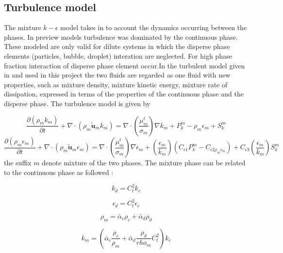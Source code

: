 \documentclass[
10pt, %
a4paper, %
oneside, %
headinclude,footinclude, %
BCOR5mm, %
]{scrartcl}
\begin{document}
\subsection{Turbulence model}
The mixture $k-\epsilon$ model takes in to account the dynamics occurring between the phases. In preview models turbulence was dominated by the continuous phase. These modeled are only valid for dilute systems in which the disperse phase elements (particles, bubble, droplet) interation are neglected. For high phase fraction interaction of disperse phase element occur.In the turbulent model given in \cite{behzadi:2003} and used in this project the two fluids are regarded as one fluid with new properties, such as mixture density, mixture kinetic energy, mixture rate of dissipation, expressed in terms of the properties of the continuous phase and the disperse phase. The turbulence model is given by

\begin{equation}
\frac{\partial (\rho_{m}k_{m})}{\partial t}+\nabla\cdot(\rho_{m}\tilde{\textbf{u}}_{m}k_{m})=
\nabla\cdot\left(\frac{\mu_{m}^{t}}{\sigma_{m}}\right)\nabla k_{m} +P_{k}^{m}-\rho_{m}\epsilon_{m}+S_{k}^{m}
\end{equation}
\begin{equation}
\frac{\partial (\rho_{m}\epsilon_{m})}{\partial t}+\nabla\cdot(\rho_{m}\tilde{\textbf{u}}_{m}\epsilon_{m})=
\nabla\cdot\left(\frac{\mu_{m}^{t}}{\sigma_{m}}\right)\nabla \epsilon_{m} +\left(\frac{\epsilon_{m}}{k_{m}}\right)(C_{\epsilon 1}P_{k}^{m}-C_{\epsilon 2\rho_{m}\epsilon_{m}})+C_{\epsilon 3}\left(\frac{\epsilon_{m}}{k_{m}}\right) S_{k}^{m}
\end{equation}
the suffix $m$ denote mixture of the two phases. The mixture phase can be related to the continuous phase as followed \cite{behzadi:2003}:

\begin{equation}
k_{d} = C_{t}^{2}k_{c} \nonumber
\end{equation}

\begin{equation}
\epsilon_{d} = C_{t}^{2}\epsilon_{c} \nonumber
\end{equation}

\begin{equation}
\rho_{m}= \bar{\alpha}_{c}\rho_{c}+\bar{\alpha}_{d}\rho_{d} \nonumber
\end{equation}

\begin{equation}
k_{m} = \left(  \bar{\alpha}_{c} \frac{\rho_{c}}{\rho_{m}}+ \bar{\alpha}_{d}\frac{\rho_{d}}{rho_{m}}C_{t}^{2}   \right)k_{c} \nonumber
\end{equation}
\end{document}
